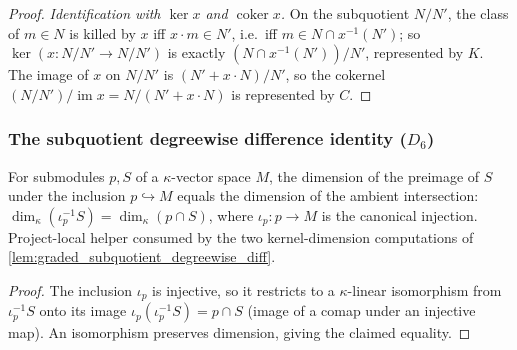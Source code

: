 \begin{proof}
  \emph{Identification with \(\ker x\) and \(\operatorname{coker} x\).} On the
  subquotient \(N/N'\), the class of \(m \in N\) is killed by \(x\) iff
  \(x \cdot m \in N'\), i.e.\ iff \(m \in N \cap x^{-1}(N')\); so \(\ker(x : N/N' \to
  N/N')\) is exactly \((N \cap x^{-1}(N'))/N'\), represented by \(K\). The image of
  \(x\) on \(N/N'\) is \((N' + x \cdot N)/N'\), so the cokernel
  \((N/N')/\operatorname{im} x = N/(N' + x \cdot N)\) is represented by \(C\).
\end{proof}

\subsubsection*{The subquotient degreewise difference identity ($D_6$)}

\begin{lemma}

  \label{lem:graded_finrank_comap_subtype}
  For submodules \(p, S\) of a \(\kappa\)-vector space \(M\), the dimension of the
  preimage of \(S\) under the inclusion \(p \hookrightarrow M\) equals the dimension of
  the ambient intersection: \(\dim_\kappa(\iota_p^{-1} S) = \dim_\kappa(p \cap S)\),
  where \(\iota_p : p \to M\) is the canonical injection. Project-local helper consumed
  by the two kernel-dimension computations of \cref{lem:graded_subquotient_degreewise_diff}.
\end{lemma}
\begin{proof}

\leanok
  The inclusion \(\iota_p\) is injective, so it restricts to a \(\kappa\)-linear
  isomorphism from \(\iota_p^{-1} S\) onto its image \(\iota_p(\iota_p^{-1} S) = p \cap S\)
  (image of a comap under an injective map). An isomorphism preserves dimension, giving
  the claimed equality.
\end{proof}

